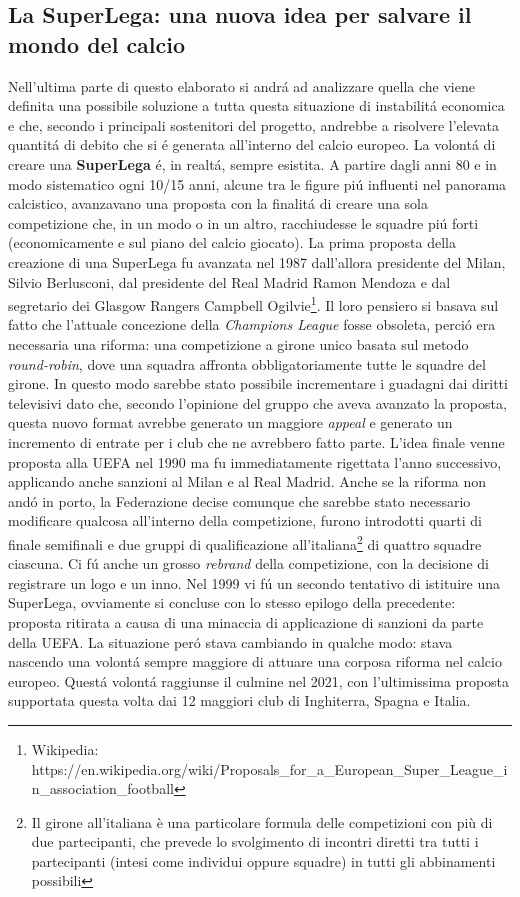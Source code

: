 \documentclass[
    corpo=12pt,
    oneside,
    evenboxes,
    tipotesi=triennale,
    stile=classica,
    oldstyle,
    autoretitolo,
    greek,
]{toptesi}
\begin{document}
\begin{interlinea}{1.5}
\chapter{La SuperLega: una nuova idea per salvare il mondo del calcio}
Nell'ultima parte di questo elaborato si andr\'a ad analizzare quella che viene definita una possibile soluzione a tutta questa situazione di 
instabilit\'a economica e che, secondo i principali sostenitori del progetto, andrebbe a risolvere l'elevata quantit\'a di debito 
che si \'e generata all'interno del calcio europeo.
La volont\'a di creare una \textbf{SuperLega} \'e, in realt\'a, sempre esistita. A partire dagli anni 80 e in modo sistematico ogni 10/15 
anni, alcune tra le figure pi\'u influenti nel panorama calcistico, avanzavano una proposta con la finalit\'a di creare una sola competizione che,
in un modo o in un altro, racchiudesse le squadre pi\'u forti (economicamente e sul piano del calcio giocato).\newline
La prima proposta della creazione di una SuperLega fu avanzata nel 1987 dall'allora presidente del Milan, Silvio Berlusconi, dal presidente
del Real Madrid Ramon Mendoza e dal segretario dei Glasgow Rangers Campbell Ogilvie\footnote{Wikipedia: \newline https://en.wikipedia.org/wiki/Proposals\_for\_a\_European\_Super\_League\_in\_association\_football}.
Il loro pensiero si basava sul fatto che l'attuale concezione della \emph{Champions League} fosse obsoleta, perci\'o era necessaria una riforma:
una competizione a girone unico basata sul metodo \emph{round-robin}, dove una squadra affronta obbligatoriamente tutte le squadre del girone. 
In questo modo sarebbe stato possibile incrementare i guadagni dai diritti televisivi dato che, secondo l'opinione del gruppo che aveva 
avanzato la proposta, questa nuovo format avrebbe generato un maggiore \emph{appeal} e generato un incremento di entrate per i club che 
ne avrebbero fatto parte. L'idea finale venne proposta alla UEFA nel 1990 ma fu immediatamente rigettata l'anno successivo, applicando anche 
sanzioni al Milan e al Real Madrid. Anche se la riforma non and\'o in porto, la Federazione decise comunque che sarebbe stato necessario modificare
qualcosa all'interno della competizione, furono introdotti quarti di finale semifinali e due gruppi di qualificazione all'italiana\footnote{Il girone all'italiana è una particolare formula delle competizioni con più di due partecipanti, che prevede lo svolgimento di incontri diretti tra tutti i partecipanti (intesi come individui oppure squadre) in tutti gli abbinamenti possibili}
di quattro squadre ciascuna. Ci f\'u anche un grosso \emph{rebrand} della competizione, con la decisione di registrare un logo e un inno.\newline
Nel 1999 vi f\'u un secondo tentativo di istituire una SuperLega, ovviamente si concluse con lo stesso epilogo della precedente: proposta 
ritirata a causa di una minaccia di applicazione di sanzioni da parte della UEFA. La situazione per\'o stava cambiando in qualche modo: 
stava nascendo una volont\'a sempre maggiore di attuare una corposa riforma nel calcio europeo. Quest\'a volont\'a raggiunse il culmine
nel 2021, con l'ultimissima proposta supportata questa volta dai 12 maggiori club di Inghiterra, Spagna e Italia. 

\end{interlinea}
\end{document}
